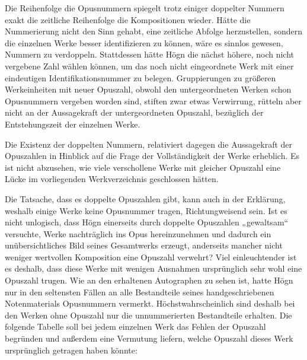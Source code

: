 Die Reihenfolge die Opusnummern spiegelt trotz einiger doppelter Nummern
exakt die zeitliche Reihenfolge die Kompositionen wieder. Hätte die
Nummerierung nicht den Sinn gehabt, eine zeitliche Abfolge
herzustellen, sondern die einzelnen Werke besser identifizieren zu
können, wäre es sinnlos gewesen, Nummern zu verdoppeln. Stattdessen
hätte Högn die nächst höhere, noch nicht vergebene Zahl wählen können,
um das noch nicht eingeordnete Werk mit einer eindeutigen
Identifikationsnummer zu belegen. Gruppierungen zu größeren
Werkeinheiten mit neuer Opuszahl, obwohl den untergeordneten Werken
schon Opusnummern vergeben worden sind, stiften zwar etwas Verwirrung,
rütteln aber nicht an der Aussagekraft der untergeordneten Opuszahl,
bezüglich der Entstehungszeit der einzelnen Werke.

Die Existenz der doppelten Nummern, relativiert dagegen die Aussagekraft
der Opuszahlen in Hinblick auf die Frage der Vollständigkeit der Werke
erheblich. Es ist nicht abzusehen, wie viele verschollene Werke mit
gleicher Opuszahl eine Lücke im vorliegenden Werkverzeichnis
geschlossen hätten.

Die Tatsache, dass es doppelte Opuszahlen gibt, kann auch in der
Erklärung, weshalb einige Werke keine Opusnummer tragen,
Richtungweisend sein. Ist es nicht unlogisch, dass Högn einerseits
durch doppelte Opuszahlen „gewaltsam“ versuchte, Werke nachträglich ins
Opus hereinzunehmen und dadurch ein unübersichtliches Bild seines
Gesamtwerks erzeugt, anderseits mancher nicht weniger wertvollen
Komposition eine Opuszahl verwehrt? Viel einleuchtender ist es deshalb,
dass diese Werke mit wenigen Ausnahmen ursprünglich sehr wohl eine
Opuszahl trugen. Wie an den erhaltenen Autographen zu sehen ist, hatte
Högn nur in den seltensten Fällen an alle Bestandteile seines
handgeschriebenen Notenmaterials Opusnummern vermerkt.
Höchstwahrscheinlich sind deshalb bei den Werken ohne Opuszahl nur die
unnummerierten Bestandteile erhalten. Die folgende Tabelle soll bei
jedem einzelnen Werk das Fehlen der Opuszahl begründen und außerdem
eine Vermutung liefern, welche Opuszahl dieses Werk ursprünglich
getragen haben könnte:

